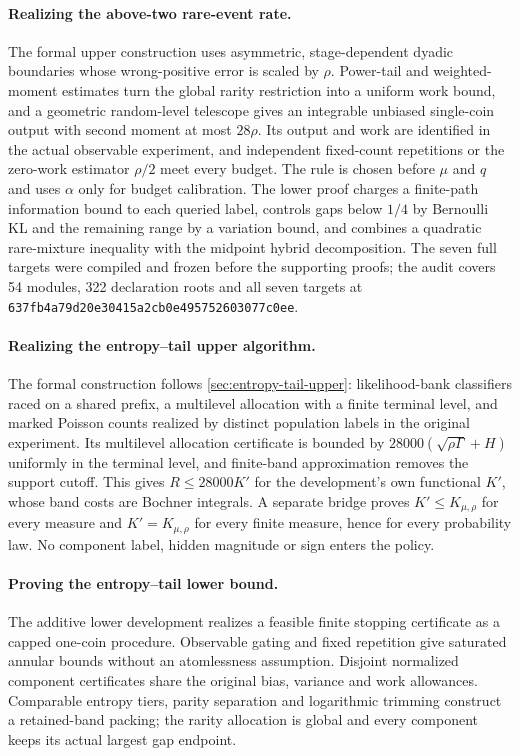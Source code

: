 \paragraph{Realizing the above-two rare-event rate.}
The formal upper construction uses asymmetric, stage-dependent dyadic
boundaries whose wrong-positive error is scaled by $\rho$. Power-tail and
weighted-moment estimates turn the global rarity restriction into a
uniform work bound, and a geometric random-level telescope gives an
integrable unbiased single-coin output with second moment at most
$28\rho$. Its output and work are identified in the actual observable
experiment, and independent fixed-count repetitions or the zero-work
estimator $\rho/2$ meet every budget. The rule is chosen before $\mu$ and
$q$ and uses $\alpha$ only for budget calibration. The lower proof charges
a finite-path information bound to each queried label, controls gaps
below $1/4$ by Bernoulli KL and the remaining range by a variation bound,
and combines a quadratic rare-mixture inequality with the midpoint hybrid
decomposition. The seven full targets were compiled and frozen before
the supporting proofs; the audit covers 54 modules, 322 declaration roots
and all seven targets at
\nolinkurl{637fb4a79d20e30415a2cb0e495752603077c0ee}.

\paragraph{Realizing the entropy--tail upper algorithm.}
The formal construction follows \cref{sec:entropy-tail-upper}:
likelihood-bank classifiers raced on a shared prefix, a multilevel
allocation with a finite terminal level, and marked Poisson counts realized
by distinct population labels in the original experiment. Its multilevel
allocation certificate is bounded by $28000(\sqrt{\rho\Gamma}+H)$ uniformly in
the terminal level, and finite-band approximation removes the support cutoff. This gives
$R\le28000K'$ for the development's own functional $K'$, whose band costs
are Bochner integrals. A separate bridge proves $K'\le K_{\mu,\rho}$ for every
measure and $K'=K_{\mu,\rho}$ for every finite measure, hence for every
probability law. No component label, hidden
magnitude or sign enters the policy.

\paragraph{Proving the entropy--tail lower bound.}
The additive lower development realizes a feasible finite stopping
certificate as a capped one-coin procedure. Observable gating and fixed
repetition give saturated annular bounds without an atomlessness assumption.
Disjoint normalized component certificates share the original bias, variance
and work allowances. Comparable entropy tiers, parity separation and
logarithmic trimming construct a retained-band packing; the rarity allocation
is global and every component keeps its actual largest gap endpoint.

